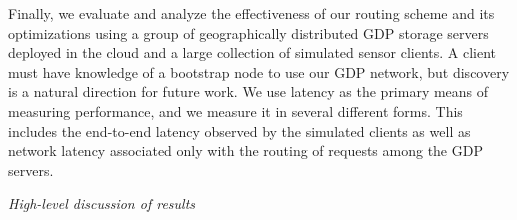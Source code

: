 Finally, we evaluate and analyze the effectiveness of our routing scheme and its optimizations using a group of geographically distributed GDP storage servers deployed in the cloud and a large collection of simulated sensor clients. A client must have knowledge of a bootstrap node to use our GDP network, but discovery is a natural direction for future work. We use latency as the primary means of measuring performance, and we measure it in several different forms. This includes the end-to-end latency observed by the simulated clients as well as network latency associated only with the routing of requests among the GDP servers.

\textit{High-level discussion of results}
